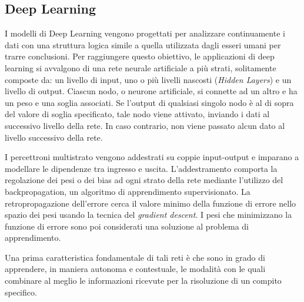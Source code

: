 \subsection{Deep Learning}
I modelli di Deep Learning vengono progettati per analizzare continuamente i dati con una struttura logica simile a quella utilizzata dagli esseri umani per trarre conclusioni. Per raggiungere questo obiettivo, le applicazioni di deep learning si avvalgono di una rete neurale artificiale a più strati, solitamente composte da: un livello di input, uno o più livelli nascosti (\textit{Hidden Layers}) e un livello di output. Ciascun nodo, o neurone artificiale, si connette ad un altro e ha un peso e una soglia associati. Se l'output di qualsiasi singolo nodo è al di sopra del valore di soglia specificato, tale nodo viene attivato, inviando i dati al successivo livello della rete. In caso contrario, non viene passato alcun dato al livello successivo della rete.

I percettroni multistrato vengono addestrati su coppie input-output e imparano a modellare le dipendenze tra ingresso e uscita. L'addestramento comporta la regolazione dei pesi o dei bias ad ogni strato della rete mediante l'utilizzo del backpropagation, un algoritmo di apprendimento supervisionato. La retropropagazione dell'errore cerca il valore minimo della funzione di errore nello spazio dei pesi usando la tecnica del \textit{gradient descent}. I pesi che minimizzano la funzione di errore sono poi considerati una soluzione al problema di apprendimento. 

Una prima caratteristica fondamentale di tali reti è che sono in grado di apprendere, in maniera autonoma e contestuale, le modalità con le quali combinare al meglio le informazioni ricevute per la risoluzione di un compito specifico.

